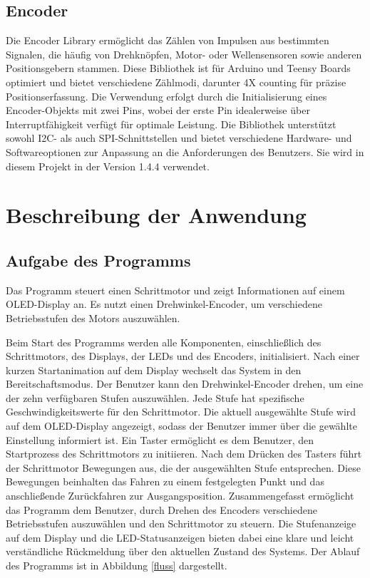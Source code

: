 {{{			\subsection{Encoder}
			
			Die Encoder Library ermöglicht das Zählen von Impulsen aus bestimmten Signalen, die häufig von Drehknöpfen, Motor- oder Wellensensoren sowie anderen Positionsgebern stammen. Diese Bibliothek ist für Arduino und Teensy Boards optimiert und bietet verschiedene Zählmodi, darunter 4X counting für präzise Positionserfassung. Die Verwendung erfolgt durch die Initialisierung eines Encoder-Objekts mit zwei Pins, wobei der erste Pin idealerweise über Interruptfähigkeit verfügt für optimale Leistung. Die Bibliothek unterstützt sowohl I2C- als auch SPI-Schnittstellen und bietet verschiedene Hardware- und Softwareoptionen zur Anpassung an die Anforderungen des Benutzers. Sie wird in diesem Projekt in der Version 1.4.4 verwendet.\cite{Stoffregen:2024}
			
			
			
			
			\section{Beschreibung der Anwendung}
			
			\subsection{Aufgabe des Programms}
			Das Programm steuert einen Schrittmotor und zeigt Informationen auf einem OLED-Display an. Es nutzt einen Drehwinkel-Encoder, um verschiedene Betriebsstufen des Motors auszuwählen.
			
					
			
			
			
			Beim Start des Programms werden alle Komponenten, einschließlich des Schrittmotors, des Displays, der LEDs und des Encoders, initialisiert. Nach einer kurzen Startanimation auf dem Display wechselt das System in den Bereitschaftsmodus. Der Benutzer kann den Drehwinkel-Encoder drehen, um eine der zehn verfügbaren Stufen auszuwählen. Jede Stufe hat spezifische Geschwindigkeitswerte für den Schrittmotor. Die aktuell ausgewählte Stufe wird auf dem OLED-Display angezeigt, sodass der Benutzer immer über die gewählte Einstellung informiert ist. Ein Taster ermöglicht es dem Benutzer, den Startprozess des Schrittmotors zu initiieren. Nach dem Drücken des Tasters führt der Schrittmotor Bewegungen aus, die der ausgewählten Stufe entsprechen. Diese Bewegungen beinhalten das Fahren zu einem festgelegten Punkt und das anschließende Zurückfahren zur Ausgangsposition. Zusammengefasst ermöglicht das Programm dem Benutzer, durch Drehen des Encoders verschiedene Betriebsstufen auszuwählen und den Schrittmotor zu steuern. Die Stufenanzeige auf dem Display und die LED-Statusanzeigen bieten dabei eine klare und leicht verständliche Rückmeldung über den aktuellen Zustand des Systems. Der Ablauf des Programms ist in Abbildung \ref{fluss} dargestellt.
			
}}}
